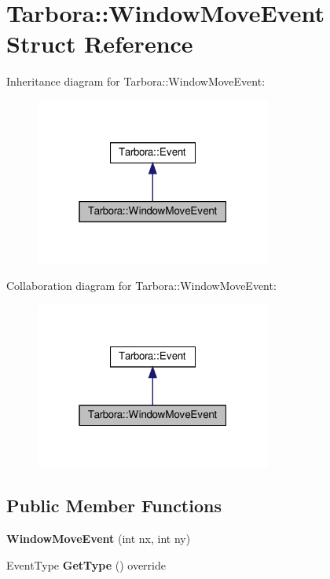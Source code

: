 \hypertarget{structTarbora_1_1WindowMoveEvent}{}\section{Tarbora\+:\+:Window\+Move\+Event Struct Reference}
\label{structTarbora_1_1WindowMoveEvent}


Inheritance diagram for Tarbora\+:\+:Window\+Move\+Event\+:\nopagebreak
\begin{figure}[H]
\begin{center}
\leavevmode
\includegraphics[width=220pt]{structTarbora_1_1WindowMoveEvent__inherit__graph}
\end{center}
\end{figure}


Collaboration diagram for Tarbora\+:\+:Window\+Move\+Event\+:\nopagebreak
\begin{figure}[H]
\begin{center}
\leavevmode
\includegraphics[width=220pt]{structTarbora_1_1WindowMoveEvent__coll__graph}
\end{center}
\end{figure}
\subsection*{Public Member Functions}
\begin{DoxyCompactItemize}
\item 
\mbox{\label{structTarbora_1_1WindowMoveEvent_ac3c7e22b30cfbba6df320d9d8f827e02}} 
{\bfseries Window\+Move\+Event} (int nx, int ny)
\item 
\mbox{\label{structTarbora_1_1WindowMoveEvent_aee67f120f4dfb7c8e20269987c93ed7c}} 
Event\+Type {\bfseries Get\+Type} () override
\end{DoxyCompactItemize}
